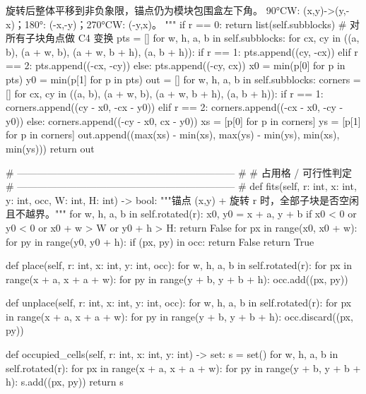 \documentclass{JXUSTmodeling}
\begin{document}
\begin{appendixx}
\begin{python}
        旋转后整体平移到非负象限，锚点仍为模块包围盒左下角。
        90°CW: (x,y)->(y,-x)；180°: (-x,-y)；270°CW: (-y,x)。
        """
        if r == 0:
            return list(self.subblocks)
        # 对所有子块角点做 C4 变换
        pts = []
        for w, h, a, b in self.subblocks:
            for cx, cy in ((a, b), (a + w, b), (a + w, b + h), (a, b + h)):
                if r == 1:
                    pts.append((cy, -cx))
                elif r == 2:
                    pts.append((-cx, -cy))
                else:
                    pts.append((-cy, cx))
        x0 = min(p[0] for p in pts)
        y0 = min(p[1] for p in pts)
        out = []
        for w, h, a, b in self.subblocks:
            corners = []
            for cx, cy in ((a, b), (a + w, b), (a + w, b + h), (a, b + h)):
                if r == 1:
                    corners.append((cy - x0, -cx - y0))
                elif r == 2:
                    corners.append((-cx - x0, -cy - y0))
                else:
                    corners.append((-cy - x0, cx - y0))
            xs = [p[0] for p in corners]
            ys = [p[1] for p in corners]
            out.append((max(xs) - min(xs), max(ys) - min(ys), min(xs), min(ys)))
        return out

    # ------------------------------------------------------------------ #
    # 占用格 / 可行性判定
    # ------------------------------------------------------------------ #
    def fits(self, r: int, x: int, y: int, occ, W: int, H: int) -> bool:
        """锚点 (x,y) + 旋转 r 时，全部子块是否空闲且不越界。"""
        for w, h, a, b in self.rotated(r):
            x0, y0 = x + a, y + b
            if x0 < 0 or y0 < 0 or x0 + w > W or y0 + h > H:
                return False
            for px in range(x0, x0 + w):
                for py in range(y0, y0 + h):
                    if (px, py) in occ:
                        return False
        return True

    def place(self, r: int, x: int, y: int, occ):
        for w, h, a, b in self.rotated(r):
            for px in range(x + a, x + a + w):
                for py in range(y + b, y + b + h):
                    occ.add((px, py))

    def unplace(self, r: int, x: int, y: int, occ):
        for w, h, a, b in self.rotated(r):
            for px in range(x + a, x + a + w):
                for py in range(y + b, y + b + h):
                    occ.discard((px, py))

    def occupied_cells(self, r: int, x: int, y: int) -> set:
        s = set()
        for w, h, a, b in self.rotated(r):
            for px in range(x + a, x + a + w):
                for py in range(y + b, y + b + h):
                    s.add((px, py))
        return s



\end{python}
\end{appendixx}
\end{document}
